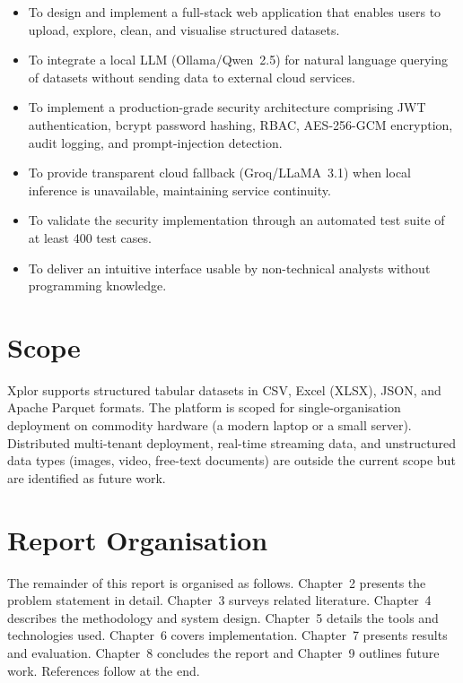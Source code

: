 \documentclass[12pt,a4paper]{report}
\begin{document}
\begin{itemize}[leftmargin=2em]
    \item To design and implement a full-stack web application that enables users to upload, explore, clean, and visualise structured datasets.
    \item To integrate a local LLM (Ollama/Qwen~2.5) for natural language querying of datasets without sending data to external cloud services.
    \item To implement a production-grade security architecture comprising JWT authentication, bcrypt password hashing, RBAC, AES-256-GCM encryption, audit logging, and prompt-injection detection.
    \item To provide transparent cloud fallback (Groq/LLaMA~3.1) when local inference is unavailable, maintaining service continuity.
    \item To validate the security implementation through an automated test suite of at least 400 test cases.
    \item To deliver an intuitive interface usable by non-technical analysts without programming knowledge.
\end{itemize}

\section{Scope}

Xplor supports structured tabular datasets in CSV, Excel (XLSX), JSON, and Apache Parquet formats. The platform is scoped for single-organisation deployment on commodity hardware (a modern laptop or a small server). Distributed multi-tenant deployment, real-time streaming data, and unstructured data types (images, video, free-text documents) are outside the current scope but are identified as future work.

\section{Report Organisation}

The remainder of this report is organised as follows. Chapter~2 presents the problem statement in detail. Chapter~3 surveys related literature. Chapter~4 describes the methodology and system design. Chapter~5 details the tools and technologies used. Chapter~6 covers implementation. Chapter~7 presents results and evaluation. Chapter~8 concludes the report and Chapter~9 outlines future work. References follow at the end.
\end{document}
